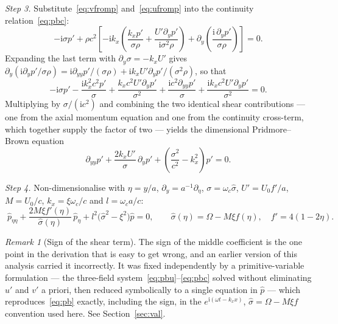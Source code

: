 \documentclass[11pt,a4paper]{article}
\newcommand{\Om}{\Omega}
\newcommand{\ii}{\mathrm{i}}
\newcommand{\sig}{\hat\sigma}
\theoremstyle{plain}
\theoremstyle{remark}
\newtheorem{remark}[theorem]{Remark}
\begin{document}
\emph{Step 3.} Substitute~\eqref{eq:vfromp} and~\eqref{eq:ufromp} into the continuity
relation~\eqref{eq:pbc}:
\begin{equation}
-\ii\sigma p'+\rho c^2\left[-\ii k_x\left(\frac{k_xp'}{\sigma\rho}
+\frac{U'\partial_yp'}{\ii\sigma^2\rho}\right)
+\partial_y\!\left(\frac{\ii\,\partial_yp'}{\sigma\rho}\right)\right]=0 .
\end{equation}
Expanding the last term with $\partial_y\sigma=-k_xU'$ gives
$\partial_y(\ii\partial_yp'/\sigma\rho)=\ii\partial_{yy}p'/(\sigma\rho)+\ii k_xU'\partial_yp'/(\sigma^2\rho)$,
so that
\begin{equation}
-\ii\sigma p'-\frac{\ii k_x^2c^2p'}{\sigma}
+\frac{k_xc^2U'\partial_yp'}{\sigma^2}
+\frac{\ii c^2\partial_{yy}p'}{\sigma}
+\frac{\ii k_xc^2U'\partial_yp'}{\sigma^2}=0 .
\end{equation}
Multiplying by $\sigma/(\ii c^2)$ and combining the two identical shear contributions --- one from the
axial momentum equation and one from the continuity cross-term, which together supply the factor of two
--- yields the dimensional Pridmore--Brown equation
\begin{equation}
\partial_{yy}p'+\frac{2k_xU'}{\sigma}\,\partial_yp'
+\left(\frac{\sigma^2}{c^2}-k_x^2\right)p'=0 .
\label{eq:pbdim}
\end{equation}

\emph{Step 4.} Non-dimensionalise with $\eta=y/a$, $\partial_y=a^{-1}\partial_\eta$,
$\sigma=\omega_c\sig$, $U'=U_0f'/a$, $M=U_0/c$, $k_x=\xi\omega_c/c$ and $l=\omega_ca/c$:
\begin{equation}
\boxed{\;
\hat p_{\eta\eta}+\frac{2M\xi f'(\eta)}{\sig(\eta)}\,\hat p_\eta
+l^2\bigl(\sig^2-\xi^2\bigr)\hat p=0,
\qquad \sig(\eta)=\Om-M\xi f(\eta),\quad f'=4(1-2\eta).\;}
\label{eq:pb}
\end{equation}

\begin{remark}[Sign of the shear term]
The sign of the middle coefficient is the one point in the derivation that is easy to get wrong, and
an earlier version of this analysis carried it incorrectly. It was fixed independently by a
primitive-variable formulation --- the three-field system~\eqref{eq:pbu}--\eqref{eq:pbc} solved without
eliminating $u'$ and $v'$ a priori, then reduced symbolically to a single equation in $\hat p$ ---
which reproduces~\eqref{eq:pb} exactly, including the sign, in the
$e^{\ii(\omega t-k_xx)}$, $\sig=\Om-M\xi f$ convention used here. See Section~\ref{sec:val}.
\end{remark}
\end{document}
